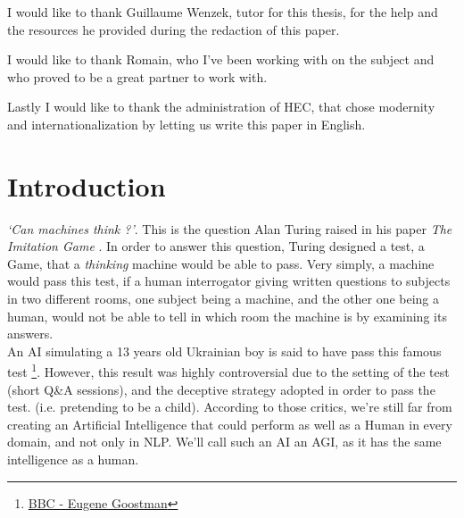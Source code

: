 \documentclass[12pt]{article}
\begin{document}
I would like to thank Guillaume Wenzek, tutor for this thesis, for the help and
the resources he provided  during the redaction of this paper. \\

\bigskip


\noindent I would like to thank Romain, who I've been working with on the subject and who
proved to be a great partner to work with.\\

\bigskip


\noindent Lastly I would like to thank the administration of HEC, that chose modernity
and internationalization by letting us write this paper in English.


\pagebreak



\section*{Introduction}\label{introduction}

\smallskip

{\em \lq Can machines think ?\rq }. This is the question Alan Turing raised in
his paper {\em The Imitation Game} \cite{Turing}. In order to answer this
question, Turing designed a test, a Game, that a {\em thinking} machine would be
able to pass. Very simply, a machine would pass this test, if a human
interrogator giving written questions to subjects in two different rooms, one
subject being a machine, and the other one being a human, would not be able to
tell in which room the machine is by examining its answers. \\

An AI simulating a 13 years old Ukrainian boy is said to have pass this famous
test \footnote{\href{http://www.bbc.com/news/technology-27762088} {BBC - Eugene
Goostman}}. However, this result was highly controversial due to the setting of
the test (short Q\&A sessions), and the deceptive strategy adopted in order to
pass the test. (i.e. pretending to be a child). According to those critics,
we're still far from creating an Artificial Intelligence that could perform as
well as a Human in every domain, and not only in \gls{NLP}. We'll call such an
AI an \gls{AGI}, as it has the same intelligence as a human. \\
\end{document}
